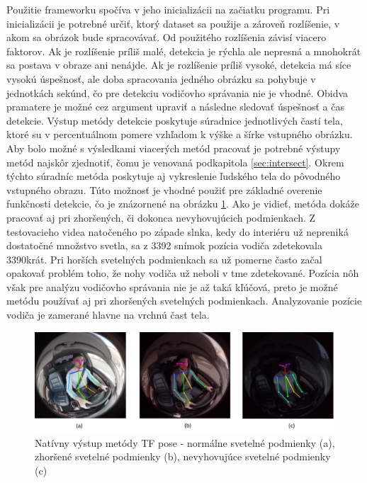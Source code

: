 \documentclass[slovak,master,dept460,male,cpp,cpdeclaration]{diploma}
\begin{document}
Použitie frameworku spočíva v jeho inicializácii na začiatku programu. Pri inicializácii je potrebné určiť, ktorý dataset  sa použije a zároveň rozlíšenie, v akom  sa obrázok bude spracovávať. Od použitého rozlíšenia závisí viacero faktorov. Ak je rozlíšenie príliš malé, detekcia je rýchla ale nepresná a mnohokrát   sa postava v obraze ani nenájde. Ak je rozlíšenie príliš vysoké, detekcia má síce vysokú úspešnosť, ale doba spracovania  jedného obrázku sa  pohybuje v jednotkách sekúnd, čo pre detekciu vodičovho správania nie je vhodné. Obidva pramatere je možné cez argument upraviť a následne sledovať úspešnosť a čas detekcie. Výstup metódy detekcie poskytuje súradnice jednotlivých častí tela, ktoré su v percentuálnom pomere vzhľadom k výške a šírke vstupného obrázku. Aby bolo možné s výsledkami viacerých metód pracovať je potrebné  výstupy metód najskôr zjednotiť, čomu je venovaná podkapitola \ref{sec:intersect}. Okrem týchto súradníc  metóda poskytuje  aj vykreslenie  ľudského tela do pôvodného vstupného obrazu. Túto možnosť je vhodné použiť pre základné overenie funkčnosti detekcie, čo je znázornené na obrázku \ref{fig:tfResult}. Ako je vidieť, metóda dokáže pracovať aj pri zhoršených, či dokonca nevyhovujúcich podmienkach. Z testovacieho videa natočeného po západe slnka, kedy do interiéru už nepreniká dostatočné množstvo svetla,  sa z 3392 snímok pozícia vodiča zdetekovala 3390krát. Pri horších svetelných podmienkach sa už pomerne často začal opakovať problém toho, že nohy vodiča už neboli v tme zdetekované. Pozícia nôh však pre analýzu vodičovho správania nie je až taká kľúčová, preto je možné metódu používať aj pri zhoršených svetelných podmienkach. Analyzovanie pozície vodiča je zamerané hlavne na vrchnú čast tela. 

\begin{figure}[H]
	\centering
	\includegraphics[width=1\textwidth]{Figures/tf_result.png}
	\caption{Natívny výstup metódy TF pose - normálne svetelné podmienky (a), zhoršené svetelné podmienky (b), nevyhovujúce svetelné podmienky (c)}
	\label{fig:tfResult}
\end{figure}
\end{document}

